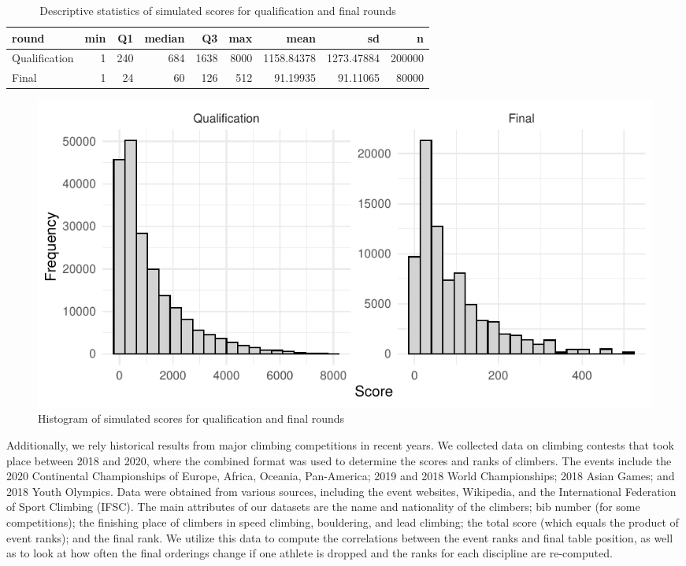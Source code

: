 \documentclass[12pt]{article}
\begin{document}
\begin{table}[H]

\caption{\label{tab:unnamed-chunk-4}Descriptive statistics of simulated scores for qualification and final rounds}
\centering
\begin{tabular}[t]{lrrrrrrrr}
\toprule
round & min & Q1 & median & Q3 & max & mean & sd & n\\
\midrule
Qualification & 1 & 240 & 684 & 1638 & 8000 & 1158.84378 & 1273.47884 & 200000\\
Final & 1 & 24 & 60 & 126 & 512 & 91.19935 & 91.11065 & 80000\\
\bottomrule
\end{tabular}
\end{table}

\begin{figure}

{\centering \includegraphics{draft_files/figure-latex/unnamed-chunk-5-1} 

}

\caption{Histogram of simulated scores for qualification and final rounds}\label{fig:unnamed-chunk-5}
\end{figure}

Additionally, we rely historical results from major climbing
competitions in recent years. We collected data on climbing contests
that took place between 2018 and 2020, where the combined format was
used to determine the scores and ranks of climbers. The events include
the 2020 Continental Championships of Europe, Africa, Oceania,
Pan-America; 2019 and 2018 World Championships; 2018 Asian Games; and
2018 Youth Olympics. Data were obtained from various sources, including
the event websites, Wikipedia, and the International Federation of Sport
Climbing (IFSC). The main attributes of our datasets are the name and
nationality of the climbers; bib number (for some competitions); the
finishing place of climbers in speed climbing, bouldering, and lead
climbing; the total score (which equals the product of event ranks); and
the final rank. We utilize this data to compute the correlations between
the event ranks and final table position, as well as to look at how
often the final orderings change if one athlete is dropped and the ranks
for each discipline are re-computed.
\end{document}
